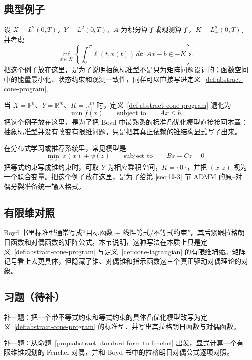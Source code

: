 \subsection{典型例子}

\begin{example}[积分型目标与算子约束]
设 $X=L^2(0,T)$，$Y=L^2(0,T)$，$A$ 为积分算子或观测算子，$K=L^2_+(0,T)$，并考虑
\[
\inf_{x\in X}\left\{\int_0^T \ell(t,x(t))\,dt:\ Ax-b\in -K\right\}.
\]
把这个例子放在这里，是为了说明抽象标准型不是只为矩阵问题设计的；函数空间中的能量最小化、状态约束和观测一致性，同样可以直接写进定义~\ref{def:abstract-cone-program}。
\end{example}

\begin{example}
当 $X=\mathbb R^n$、$Y=\mathbb R^m$、$K=\mathbb R_+^m$ 时，定义~\ref{def:abstract-cone-program} 退化为
\[
\min f(x)\qquad \text{subject to}\qquad Ax\le b.
\]
把这个例子放在这里，是为了把 Boyd 中最熟悉的标准凸优化模型直接接回本章：抽象标准型并没有改变有限维问题，只是把其真正依赖的锥结构显式写了出来。
\end{example}

\begin{example}[分块变量与一致性约束]
在分布式学习或推荐系统里，常见模型是
\[
\min_{x,z}\ \phi(x)+\psi(z)\qquad \text{subject to}\qquad Bx-Cz=0.
\]
把等式约束写成锥约束时，可取 $Y$ 为相应乘积空间，$K=\{0\}$，并把 $(x,z)$ 视为一个联合变量。把这个例子放在这里，是为了给第 \ref{sec:10-3} 节 ADMM 的原--对偶分裂准备统一输入格式。
\end{example}

\subsection*{有限维对照}

Boyd 书里标准型通常写成“目标函数 + 线性等式/不等式约束”，其后紧跟拉格朗日函数和对偶函数的矩阵公式。本节说明，这种写法在本质上只是定义~\ref{def:abstract-cone-program} 与定义~\ref{def:cone-lagrangian} 的有限维坍缩。矩阵记号看上去更具体，但隐藏了锥、对偶锥和指示函数这三个真正驱动对偶理论的对象。

\subsection*{习题（待补）}

\begin{exercise}[标准型改写占位]
补一题：把一个带不等式约束和等式约束的具体凸优化模型改写为定义~\ref{def:abstract-cone-program} 的标准型，并写出其拉格朗日函数与对偶函数。
\end{exercise}

\begin{exercise}
补一题：从命题~\ref{prop:abstract-standard-form-to-fenchel} 出发，显式计算一个有限维锥规划的 Fenchel 对偶，并和 Boyd 书中的拉格朗日对偶公式逐项对照。
\end{exercise}
